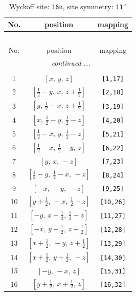 \documentclass[fleqn,8pt]{jsarticle}
\begin{document}
\begin{longtable}{ccc}
\caption{Wyckoff site: {\tt 16n}, site symmetry: {\tt 11'}}
 \\
 \hline \hline
No. & position & mapping \\ \hline \endfirsthead

\multicolumn{2}{l}{\tablename\ \thetable{}} \\
 \hline \hline
No. & position & mapping \\ \hline \endhead

 \hline \hline
\multicolumn{2}{r}{\footnotesize\it continued ...} \\ \endfoot

 \hline \hline
\multicolumn{2}{r}{} \\ \endlastfoot

1 & $\left[ x,\, y,\, z \right]$ & {\tt [1,17]} \\ \hline
2 & $\left[ \frac{1}{2} - y,\, x,\, z + \frac{1}{2} \right]$ & {\tt [2,18]} \\ \hline
3 & $\left[ y,\, \frac{1}{2} - x,\, z + \frac{1}{2} \right]$ & {\tt [3,19]} \\ \hline
4 & $\left[ x,\, \frac{1}{2} - y,\, \frac{1}{2} - z \right]$ & {\tt [4,20]} \\ \hline
5 & $\left[ \frac{1}{2} - x,\, y,\, \frac{1}{2} - z \right]$ & {\tt [5,21]} \\ \hline
6 & $\left[ \frac{1}{2} - x,\, \frac{1}{2} - y,\, z \right]$ & {\tt [6,22]} \\ \hline
7 & $\left[ y,\, x,\, - z \right]$ & {\tt [7,23]} \\ \hline
8 & $\left[ \frac{1}{2} - y,\, \frac{1}{2} - x,\, - z \right]$ & {\tt [8,24]} \\ \hline
9 & $\left[ - x,\, - y,\, - z \right]$ & {\tt [9,25]} \\ \hline
10 & $\left[ y + \frac{1}{2},\, - x,\, \frac{1}{2} - z \right]$ & {\tt [10,26]} \\ \hline
11 & $\left[ - y,\, x + \frac{1}{2},\, \frac{1}{2} - z \right]$ & {\tt [11,27]} \\ \hline
12 & $\left[ - x,\, y + \frac{1}{2},\, z + \frac{1}{2} \right]$ & {\tt [12,28]} \\ \hline
13 & $\left[ x + \frac{1}{2},\, - y,\, z + \frac{1}{2} \right]$ & {\tt [13,29]} \\ \hline
14 & $\left[ x + \frac{1}{2},\, y + \frac{1}{2},\, - z \right]$ & {\tt [14,30]} \\ \hline
15 & $\left[ - y,\, - x,\, z \right]$ & {\tt [15,31]} \\ \hline
16 & $\left[ y + \frac{1}{2},\, x + \frac{1}{2},\, z \right]$ & {\tt [16,32]} \\
\end{longtable}
\end{document}
